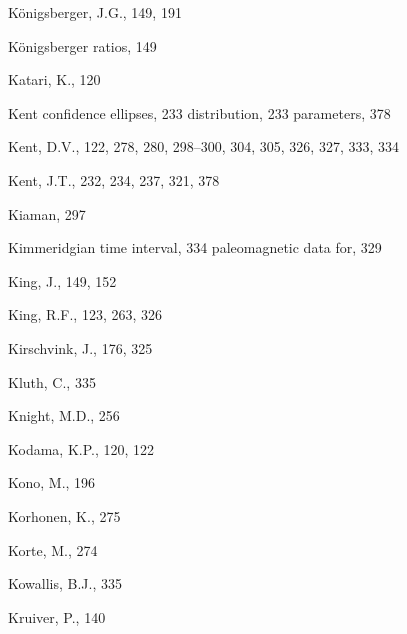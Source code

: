 \documentclass[,plain]{tauxe}
\begin{document}
\begin{theindex}
  \item K\"onigsberger, J.G., 149, 191
  \item K\"onigsberger ratios, 149
    \item Katari, K., 120
  \item Kent
    \subitem confidence ellipses, 233
    \subitem distribution, 233
	\subitem parameters, 378
  \item Kent, D.V., 122, 278, 280, 298--300, 304, 305, 326, 327, 
		333, 334
  \item Kent, J.T., 232, 234, 237, 321, 378
  \item Kiaman, 297
  \item Kimmeridgian time interval, 334
    \subitem paleomagnetic data for, 329
  \item King, J., 149, 152
  \item King, R.F., 123, 263, 326
  \item Kirschvink, J., 176, 325
  \item Kluth, C., 335
  \item Knight, M.D., 256
  \item Kodama, K.P., 120, 122
  \item Kono, M., 196
  \item Korhonen, K., 275
  \item Korte, M., 274
  \item Kowallis, B.J., 335
  \item Kruiver, P., 140


\end{theindex}
\end{document}
